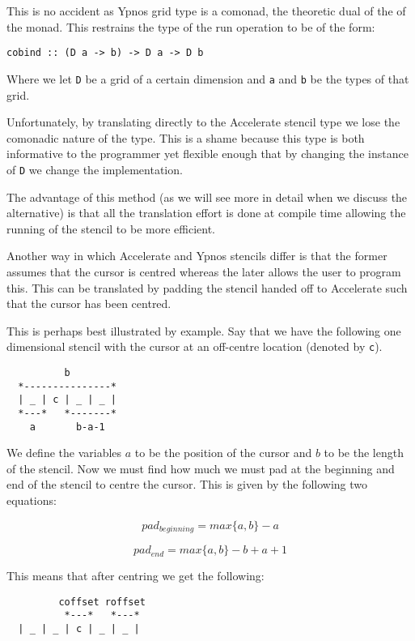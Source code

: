 This is no accident as Ypnos grid type is a comonad, the theoretic dual
of the of the monad. This restrains the type of the run operation to be
of the form:

\begin{verbatim}
cobind :: (D a -> b) -> D a -> D b
\end{verbatim}

Where we let \texttt{D} be a grid of a certain dimension and \texttt{a}
and \texttt{b} be the types of that grid.

Unfortunately, by translating directly to the Accelerate stencil type we
lose the comonadic nature of the type. This is a shame because this type
is both informative to the programmer yet flexible enough that by
changing the instance of \texttt{D} we change the implementation.

The advantage of this method (as we will see more in detail when we
discuss the alternative) is that all the translation effort is done at
compile time allowing the running of the stencil to be more efficient.

Another way in which Accelerate and Ypnos stencils differ is that the
former assumes that the cursor is centred whereas the later allows the
user to program this. This can be translated by padding the stencil
handed off to Accelerate such that the cursor has been centred.

This is perhaps best illustrated by example. Say that we have the
following one dimensional stencil with the cursor at an off-centre
location (denoted by \texttt{c}).

\begin{verbatim}
          b
  *---------------*
  | _ | c | _ | _ |
  *---*   *-------*
    a       b-a-1
\end{verbatim}

We define the variables $a$ to be the position of the cursor and $b$ to
be the length of the stencil. Now we must find how much we must pad at
the beginning and end of the stencil to centre the cursor. This is given
by the following two equations:

\[ pad_{beginning} = max \{a, b\} - a \]

\[ pad_{end} = max \{a, b\} - b + a + 1 \]

This means that after centring we get the following:

\begin{verbatim}
         coffset roffset
          *---*   *---*
  | _ | _ | c | _ | _ |
\end{verbatim}

